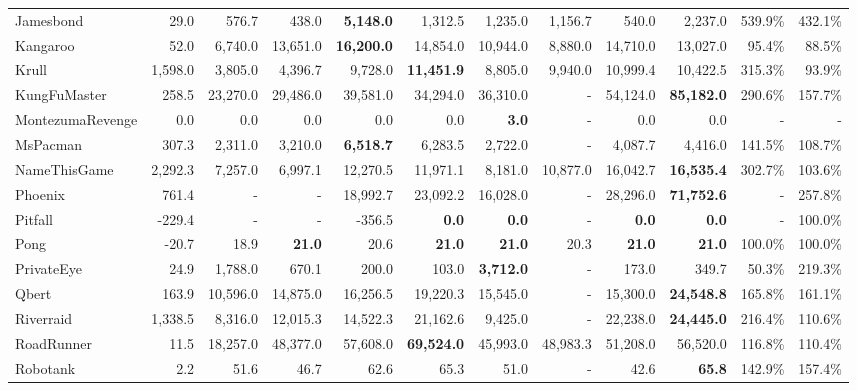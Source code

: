 \documentclass[journal]{IEEEtran}
\begin{document}
\begin{table*}[htbp]
{\begin{tabular}{lrrrrrrrrrrr}
			Jamesbond & 29.0  & 576.7 & 438.0 & \textbf{5,148.0} & 1,312.5 & 1,235.0 & 1,156.7 & 540.0 &      2,237.0  & 539.9\% & 432.1\% \\
			Kangaroo & 52.0  & 6,740.0 & 13,651.0 & \textbf{16,200.0} & 14,854.0 & 10,944.0 & 8,880.0 & 14,710.0 &     13,027.0  & 95.4\% & 88.5\% \\
			Krull & 1,598.0 & 3,805.0 & 4,396.7 & 9,728.0 & \textbf{11,451.9} & 8,805.0 & 9,940.0 & 10,999.4 &     10,422.5  & 315.3\% & 93.9\% \\
			KungFuMaster & 258.5 & 23,270.0 & 29,486.0 & 39,581.0 & 34,294.0 & 36,310.0 & -     & 54,124.0 & \textbf{   85,182.0 } & 290.6\% & 157.7\% \\
			MontezumaRevenge & 0.0   & 0.0   & 0.0   & 0.0   & 0.0   & \textbf{3.0} & -     & 0.0   & 0.0   & -     & - \\
			MsPacman & 307.3 & 2,311.0 & 3,210.0 & \textbf{6,518.7} & 6,283.5 & 2,722.0 & -     & 4,087.7 &      4,416.0  & 141.5\% & 108.7\% \\
			NameThisGame & 2,292.3 & 7,257.0 & 6,997.1 & 12,270.5 & 11,971.1 & 8,181.0 & 10,877.0 & 16,042.7 & \textbf{   16,535.4 } & 302.7\% & 103.6\% \\
			Phoenix & 761.4 & -     & -     & 18,992.7 & 23,092.2 & 16,028.0 & -     & 28,296.0 & \textbf{   71,752.6 } & -     & 257.8\% \\
			Pitfall & -229.4 & -     & -     & -356.5 & \textbf{0.0}   & \textbf{0.0}   & -     & \textbf{0.0}   & \textbf{0.0}   & -     & 100.0\% \\
			Pong  & -20.7 & 18.9  & \textbf{21.0} & 20.6  & \textbf{21.0} & \textbf{21.0} & 20.3  & \textbf{21.0} & \textbf{         21.0 } & 100.0\% & 100.0\% \\
			PrivateEye & 24.9  & 1,788.0 & 670.1 & 200.0 & 103.0 & \textbf{3,712.0} & -     & 173.0 &         349.7  & 50.3\% & 219.3\% \\
			Qbert & 163.9 & 10,596.0 & 14,875.0 & 16,256.5 & 19,220.3 & 15,545.0 & -     & 15,300.0 & \textbf{   24,548.8 } & 165.8\% & 161.1\% \\
			Riverraid & 1,338.5 & 8,316.0 & 12,015.3 & 14,522.3 & 21,162.6 & 9,425.0 & -     & 22,238.0 & \textbf{   24,445.0 } & 216.4\% & 110.6\% \\
			RoadRunner & 11.5  & 18,257.0 & 48,377.0 & 57,608.0 & \textbf{69,524.0} & 45,993.0 & 48,983.3 & 51,208.0 &     56,520.0  & 116.8\% & 110.4\% \\
			Robotank & 2.2   & 51.6  & 46.7  & 62.6  & 65.3  & 51.0  & -     & 42.6  & \textbf{         65.8 } & 142.9\% & 157.4\% \\

\end{tabular}}
\end{table*}
\end{document}
